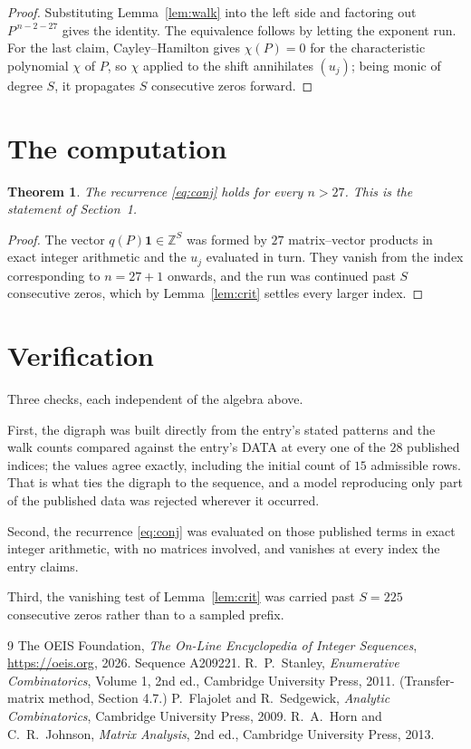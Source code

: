 \documentclass[11pt,a4paper]{article}
\theoremstyle{plain}
\newtheorem{theorem}{Theorem}
\theoremstyle{definition}
\begin{document}
\begin{proof}
Substituting Lemma~\ref{lem:walk} into the left side and factoring out
$P^{\,n-2-27}$ gives the identity. The equivalence follows by letting the exponent
run. For the last claim, Cayley--Hamilton gives $\chi(P)=0$ for the characteristic
polynomial $\chi$ of $P$, so $\chi$ applied to the shift annihilates $(u_j)$; being monic of
degree $S$, it propagates $S$ consecutive zeros forward.
\end{proof}

\section{The computation}

\begin{theorem}
The recurrence \eqref{eq:conj} holds for every $n>27$. This is the statement of
Section~1.
\end{theorem}

\begin{proof}
The vector $q(P)\mathbf{1}\in\mathbb{Z}^{S}$ was formed by $27$ matrix--vector
products in exact integer arithmetic and the $u_j$ evaluated in turn. They vanish from the
index corresponding to $n=27+1$ onwards, and the run was continued past $S$ consecutive
zeros, which by Lemma~\ref{lem:crit} settles every larger index.
\end{proof}

\section{Verification}

Three checks, each independent of the algebra above.

First, the digraph was built directly from the entry's stated patterns and the walk counts
compared against the entry's DATA at every one of the $28$ published indices; the
values agree exactly, including the initial count of $15$ admissible rows. That is
what ties the digraph to the sequence, and a model reproducing only part of the published
data was rejected wherever it occurred.

Second, the recurrence \eqref{eq:conj} was evaluated on those published terms in exact
integer arithmetic, with no matrices involved, and vanishes at every index the entry claims.

Third, the vanishing test of Lemma~\ref{lem:crit} was carried past $S=225$ consecutive
zeros rather than to a sampled prefix.

\begin{thebibliography}{9}
 The OEIS Foundation, \emph{The On-Line Encyclopedia of Integer
Sequences}, \url{https://oeis.org}, 2026. Sequence A209221.
 R.~P.~Stanley, \emph{Enumerative Combinatorics}, Volume 1, 2nd ed.,
Cambridge University Press, 2011. (Transfer-matrix method, Section 4.7.)
 P.~Flajolet and R.~Sedgewick, \emph{Analytic Combinatorics}, Cambridge
University Press, 2009.
 R.~A.~Horn and C.~R.~Johnson, \emph{Matrix Analysis}, 2nd ed., Cambridge
University Press, 2013.
\end{thebibliography}
\end{document}

